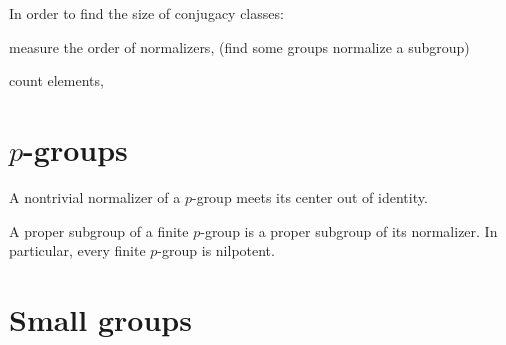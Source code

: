 \documentclass{../../large}
\begin{document}
In order to find the size of conjugacy classes:
\begin{parts}
\item measure the order of normalizers, (find some groups normalize a subgroup)
\item count elements,
\end{parts}

\section{$p$-groups}


\begin{prb}[$p$-groups]
\begin{parts}
\item A nontrivial normalizer of a $p$-group meets its center out of identity.
\item A proper subgroup of a finite $p$-group is a proper subgroup of its normalizer. In particular, every finite $p$-group is nilpotent.
\end{parts}
\end{prb}


\section{Small groups}

\begin{prb}
\end{prb}

\begin{prb}
\end{prb}

\begin{prb}
\end{prb}
\end{document}
